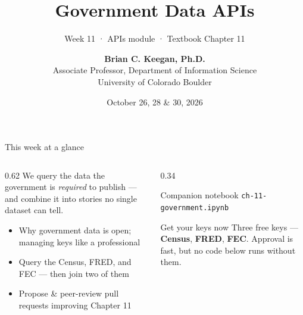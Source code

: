 \documentclass[9pt,aspectratio=169]{beamer}
\title[Week 11 · Government APIs]{{\Huge Government Data APIs}}
\subtitle{Week 11 · APIs module · Textbook Chapter 11}
\author[Keegan]{\textbf{Brian C. Keegan, Ph.D.} \\ Associate Professor, Department of Information Science \\ University of Colorado Boulder}
\date{October 26, 28 \& 30, 2026}
\begin{document}
\maketitle

\begin{frame}{This week at a glance}
    \begin{columns}[T]
        \begin{column}{0.62\textwidth}
            We query the data the government is \textit{required} to publish --- and combine it into stories no single dataset can tell.

            \vspace{1em}

            \begin{itemize}\small
                \item Why government data is open; managing keys like a professional
            \end{itemize}

            \vspace{0.5em}

            \begin{itemize}\small
                \item Query the Census, FRED, and FEC --- then join two of them
            \end{itemize}

            \vspace{0.5em}

            \begin{itemize}\small
                \item Propose \& peer-review pull requests improving Chapter 11
            \end{itemize}
        \end{column}
        \begin{column}{0.34\textwidth}
            \begin{block}{Companion notebook}
                \footnotesize \texttt{ch-11-government.ipynb}
            \end{block}
            \begin{alertblock}{Get your keys now}
                \footnotesize Three free keys --- \textbf{Census}, \textbf{FRED}, \textbf{FEC}. Approval is fast, but no code below runs without them.
            \end{alertblock}
        \end{column}
    \end{columns}
\end{frame}
\end{document}

